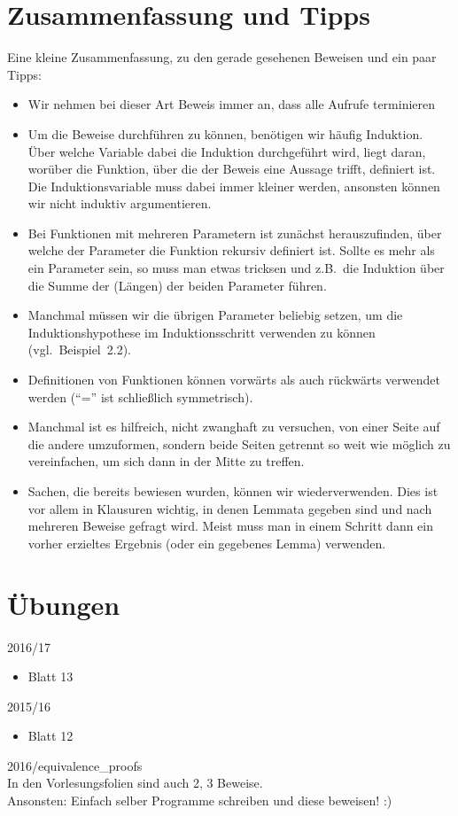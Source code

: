 \documentclass[hidelinks]{article}
\theoremstyle{plain}
\theoremstyle{definition}
\theoremstyle{rem}
\begin{document}
\begin{sloppypar}
\section{Zusammenfassung und Tipps}
Eine kleine Zusammenfassung, zu den gerade gesehenen Beweisen und ein paar Tipps:
\begin{itemize}
	\item Wir nehmen bei dieser Art Beweis immer an, dass alle Aufrufe terminieren
	\item Um die Beweise durchführen zu können, benötigen wir häufig Induktion. Über welche Variable dabei die Induktion durchgeführt wird, liegt daran, worüber die Funktion, über die der Beweis eine Aussage trifft, definiert ist.
	Die Induktionsvariable muss dabei immer kleiner werden, ansonsten können wir nicht induktiv argumentieren.
	\item Bei Funktionen mit mehreren Parametern ist zunächst herauszufinden, über welche der Parameter die Funktion rekursiv definiert ist. Sollte es mehr als ein Parameter sein, so muss man etwas tricksen und z.B.\ die Induktion über die Summe der (Längen) der beiden Parameter führen. 
	\item Manchmal müssen wir die übrigen Parameter beliebig setzen, um die Induktionshypothese im Induktionsschritt verwenden zu können (vgl.\ Beispiel~2.2).
	\item Definitionen von Funktionen können vorwärts als auch rückwärts verwendet werden (``='' ist schließlich symmetrisch).
	\item Manchmal ist es hilfreich, nicht zwanghaft zu versuchen, von einer Seite auf die andere umzuformen, sondern beide Seiten getrennt so weit wie möglich zu vereinfachen, um sich dann in der Mitte zu treffen.
	\item Sachen, die bereits bewiesen wurden, können wir wiederverwenden. Dies ist vor allem in Klausuren wichtig, in denen Lemmata gegeben sind und nach mehreren Beweise gefragt wird. Meist muss man in einem Schritt dann ein vorher erzieltes Ergebnis (oder ein gegebenes Lemma) verwenden.
\end{itemize}

\section{Übungen}
2016/17
\begin{itemize}
\item Blatt 13
\end{itemize}
2015/16
\begin{itemize}
\item Blatt 12
\end{itemize}
2016/equivalence\_proofs\\
In den Vorlesungsfolien sind auch 2, 3 Beweise.\\
Ansonsten: Einfach selber Programme schreiben und diese beweisen! :)
\end{sloppypar}
\end{document}
